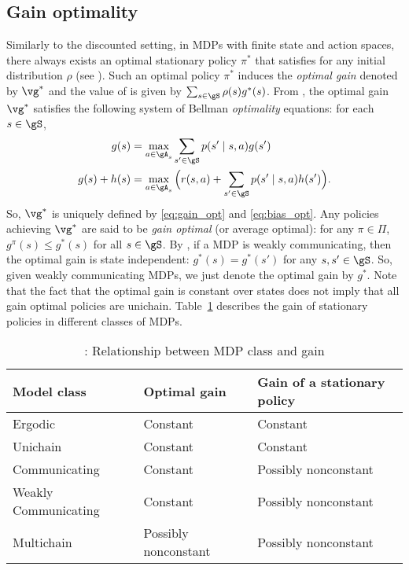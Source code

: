 \subsection{Gain optimality}
\label{ch:mdp:sec:gain}

Similarly to the discounted setting, in MDPs with finite state and action spaces, there always exists an optimal stationary policy $\pi^*$ that satisfies  for any initial distribution $\rho$ (see \cite[Theorem~9.1.8]{puterman2014markov}).
Such an optimal policy $\pi^*$ induces the \emph{optimal gain} denoted by $\vg^*$ and the value of  is given by $\sum_{s\in\gS} \rho(s)g^*(s)$.
From \cite[Chapter~9]{puterman2014markov}, the optimal gain $\vg^*$ satisfies the following system of Bellman \emph{optimality} equations: for each $s\in\gS$,
\begin{align}
    g(s) &= \max_{a\in\gA_s} \sum_{s'\in\gS}p(s'\mid s,a)g(s') \label{eq:gain_opt} \\
    g(s) +h(s) &= \max_{a\in\gA_s}\Big(r(s,a) +\sum_{s'\in\gS}p(s'\mid s,a)h(s')\Big) \label{eq:bias_opt}.
\end{align}
So, $\vg^*$ is uniquely defined by \eqref{eq:gain_opt} and \eqref{eq:bias_opt}.
Any policies achieving $\vg^*$ are said to be \emph{gain optimal} (or average optimal): for any $\pi\in\Pi$, $g^\pi(s)\le g^*(s)$ for all $s\in\gS$.
By \cite[Theorem~8.3.2]{puterman2014markov}, if a MDP is weakly communicating, then the optimal gain is state independent: $g^*(s)=g^*(s')$ for any $s,s'\in\gS$.
So, given weakly communicating MDPs, we just denote the optimal gain by $g^*$.
Note that the fact that the optimal gain is constant over states does not imply that all gain optimal policies are unichain.
Table~\ref{tab:mdp_vs_gain} describes the gain of stationary policies in different classes of MDPs.
\begin{table}[ht]
    \begin{tabular}{lll}
        \hline
        Model class          & Optimal gain         & Gain of a stationary policy \\ \hline
        Ergodic              & Constant             & Constant                    \\
        Unichain             & Constant             & Constant                    \\
        Communicating        & Constant             & Possibly nonconstant        \\
        Weakly Communicating & Constant             & Possibly nonconstant        \\
        Multichain           & Possibly nonconstant & Possibly nonconstant       \\ \hline
    \end{tabular}
    \caption{\cite[Table~8.3.1]{puterman2014markov}: Relationship between MDP class and gain}
    \label{tab:mdp_vs_gain}
\end{table}
